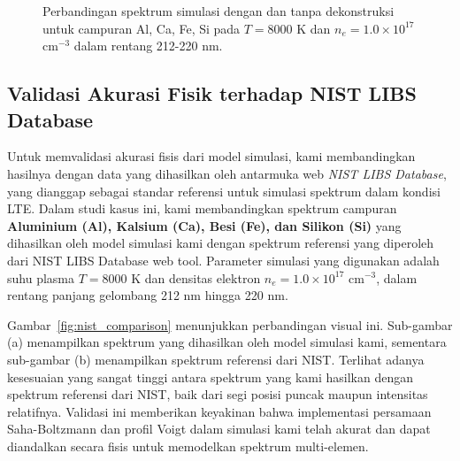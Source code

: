 \begin{figure}[H]
    \centering
    \hfill
    \caption{Perbandingan spektrum simulasi dengan dan tanpa dekonstruksi untuk campuran Al, Ca, Fe, Si pada $T = 8000$ K dan $n_e = 1.0 \times 10^{17}$ cm$^{-3}$ dalam rentang 212-220 nm.}
    \label{fig:interference}
\end{figure}





\subsection{Validasi Akurasi Fisik terhadap NIST LIBS Database}
Untuk memvalidasi akurasi fisis dari model simulasi, kami membandingkan hasilnya dengan data yang dihasilkan oleh antarmuka web \textit{NIST LIBS Database}, yang dianggap sebagai standar referensi untuk simulasi spektrum dalam kondisi LTE. Dalam studi kasus ini, kami membandingkan spektrum campuran \textbf{Aluminium (Al), Kalsium (Ca), Besi (Fe), dan Silikon (Si)} yang dihasilkan oleh model simulasi kami dengan spektrum referensi yang diperoleh dari NIST LIBS Database web tool. Parameter simulasi yang digunakan adalah suhu plasma $T = 8000$ K dan densitas elektron $n_e = 1.0 \times 10^{17}$ cm$^{-3}$, dalam rentang panjang gelombang 212 nm hingga 220 nm.

Gambar~\ref{fig:nist_comparison} menunjukkan perbandingan visual ini. Sub-gambar (a) menampilkan spektrum yang dihasilkan oleh model simulasi kami, sementara sub-gambar (b) menampilkan spektrum referensi dari NIST. Terlihat adanya kesesuaian yang sangat tinggi antara spektrum yang kami hasilkan dengan spektrum referensi dari NIST, baik dari segi posisi puncak maupun intensitas relatifnya. Validasi ini memberikan keyakinan bahwa implementasi persamaan Saha-Boltzmann dan profil Voigt dalam simulasi kami telah akurat dan dapat diandalkan secara fisis untuk memodelkan spektrum multi-elemen.


